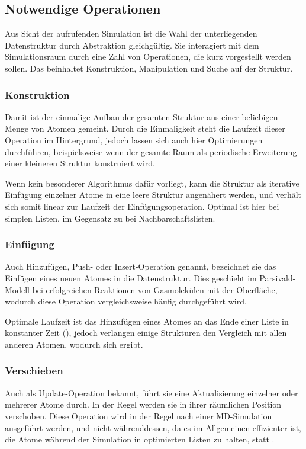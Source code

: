 \subsection{Notwendige Operationen}


Aus Sicht der aufrufenden Simulation ist die Wahl der unterliegenden Datenstruktur durch Abstraktion gleichgültig.
Sie interagiert mit dem Simulationsraum durch eine Zahl von Operationen, die kurz vorgestellt werden sollen.
Das beinhaltet Konstruktion, Manipulation und Suche auf der Struktur.

\subsubsection{Konstruktion}
Damit ist der einmalige Aufbau der gesamten Struktur aus einer beliebigen Menge von Atomen gemeint.
Durch die Einmaligkeit steht die Laufzeit dieser Operation im Hintergrund, jedoch lassen sich auch hier Optimierungen durchführen, beispielsweise wenn der gesamte Raum als periodische Erweiterung einer kleineren Struktur konstruiert wird.

Wenn kein besonderer Algorithmus dafür vorliegt, kann die Struktur als iterative Einfügung einzelner Atome in eine leere Struktur angenähert werden, und verhält sich somit linear zur Laufzeit der Einfügungsoperation.
Optimal ist hier  bei simplen Listen, im Gegensatz zu  bei Nachbarschaftslisten.

\subsubsection{Einfügung}
Auch Hinzufügen, Push- oder Insert-Operation genannt, bezeichnet sie das Einfügen eines neuen Atomes in die Datenstruktur.
Dies geschieht im Parsivald-Modell bei erfolgreichen Reaktionen von Gasmolekülen mit der Oberfläche, wodurch diese Operation vergleichsweise häufig durchgeführt wird.

Optimale Laufzeit ist das Hinzufügen eines Atomes an das Ende einer Liste in konstanter Zeit (), jedoch verlangen einige Strukturen den Vergleich mit allen anderen Atomen, wodurch sich  ergibt.

\subsubsection{Verschieben}
Auch als Update-Operation bekannt, führt sie eine Aktualisierung einzelner oder mehrerer Atome durch.
In der Regel werden sie in ihrer räumlichen Position verschoben.
Diese Operation wird in der Regel nach einer MD-Simulation ausgeführt werden, und nicht währenddessen, da es im Allgemeinen effizienter ist, die Atome während der Simulation in optimierten Listen zu halten, statt .

